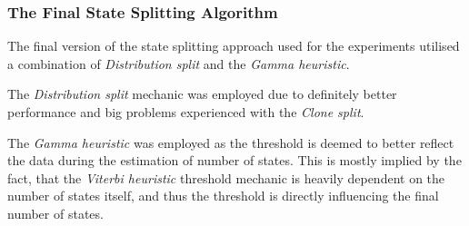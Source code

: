 \subsubsection{The Final State Splitting Algorithm}
The final version of the state splitting approach used for the experiments utilised a combination of \emph{Distribution split} and the \emph{Gamma heuristic}.

The \emph{Distribution split} mechanic was employed due to definitely better performance and big problems experienced with the \emph{Clone split}.

The \emph{Gamma heuristic} was employed as the threshold is deemed to better reflect the data during the estimation of number of states. This is mostly implied by the fact, that the \emph{Viterbi heuristic} threshold mechanic is heavily dependent on the number of states itself, and thus the threshold is directly influencing the final number of states.



